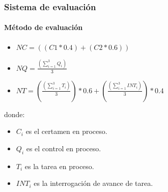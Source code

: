 \documentclass{beamer}
\begin{document}
		\begin{frame}
			\frametitle{Sistema de evaluaci\'on}
			\framesubtitle{M\'etodo de evaluaci\'on}

			\begin{block}{}
				\begin{center}
					\begin{itemize}
  							\item$NC ={\left(\displaystyle(C1 * 0.4) +(C2 * 0.6)\right)}$ \\
							\item$NQ = \frac{\left(\displaystyle\sum_{i=1}^{3}{Q_{i}}\right)}{3}$ \\
  							\item$NT = (\displaystyle\frac{\left(\displaystyle\sum_{i=1}^{3}{T_{i}}\right)}{3})*0.6 +   (\displaystyle\frac{\left(\displaystyle\sum_{i=1}^{3}{INT_{i}}\right)}{3})*0.4$
					\end{itemize}
				\end{center}	
donde:
				\begin{itemize}

					\item[] $C_{i}$ es el certamen en proceso.
					\item[] $Q_{i}$ es el control en proceso.
					\item[] $T_{i}$ es la tarea en proceso.
					\item[] $INT_{i}$ es la interrogaci\'on de avance de tarea.
				\end{itemize}
			\end{block}
		\end{frame}
\end{document}
